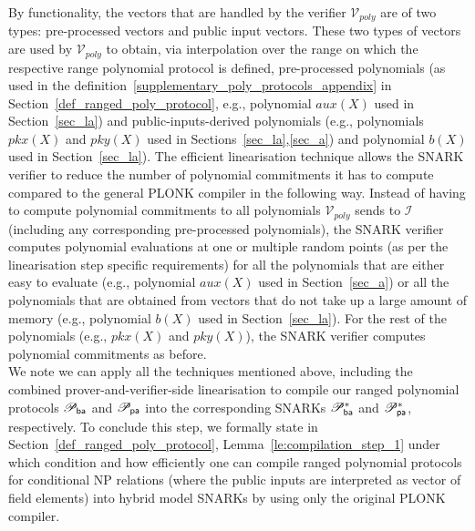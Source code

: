 \noindent By functionality, the vectors that are handled by the verifier $\mathcal{V}_{poly}$ are 
of two types: pre-processed vectors and public input vectors. These two types of vectors are used by $\mathcal{V}_{poly}$ 
to obtain, via interpolation over the range on which the respective range polynomial protocol is defined, pre-processed polynomials 
(as used in the definition~\ref{supplementary_poly_protocols_appendix} in Section~\ref{def_ranged_poly_protocol}, e.g., polynomial $aux(X)$ used in Section~\ref{sec_la}) and 
public-inputs-derived polynomials (e.g., polynomials $pkx(X)$ and $pky(X)$ used in Sections~\ref{sec_la},\ref{sec_a})
and polynomial $b(X)$ used in Section~\ref{sec_la}). The efficient linearisation technique allows the SNARK verifier to reduce the 
number of polynomial commitments it has to compute compared to the general PLONK compiler in the following way. Instead of 
having to compute polynomial commitments to all polynomials $\mathcal{V}_{poly}$ sends to $\mathcal{I}$ (including any corresponding 
pre-processed polynomials), the SNARK verifier computes polynomial evaluations at one or multiple random points (as per the linearisation 
step specific requirements) for all the polynomials that are either easy to evaluate (e.g., polynomial $aux(X)$ used in Section~\ref{sec_a}) or 
all the polynomials that are obtained from vectors that do not take up a large amount of memory (e.g., polynomial $b(X)$ used in Section~\ref{sec_la}). 
For the rest of the polynomials (e.g., $\mathit{pkx}(X)$ and $\mathit{pky}(X)$), the SNARK verifier computes polynomial commitments as before.\\

\noindent We note we can apply all the techniques mentioned above, including the combined prover-and-verifier-side linearisation 
to compile our ranged polynomial protocols $\mathscr{P}_{\mathsf{ba}}$ and $\mathscr{P}_{\mathsf{pa}}$ into the corresponding SNARKs $\mathscr{P}_{\mathsf{ba}}^{\ast}$ and $\mathscr{P}_{\mathsf{pa}}^{\ast}$, respectively. 
To conclude this step, we formally state in Section~\ref{def_ranged_poly_protocol}, Lemma~\ref{le:compilation_step_1} under which condition and how efficiently 
one can compile ranged polynomial protocols for conditional NP relations (where the public inputs are interpreted as vector of field elements) 
into hybrid model SNARKs by using only the original PLONK compiler. \\
